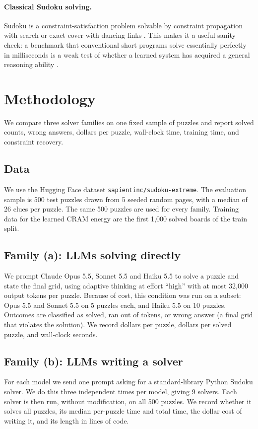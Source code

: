 \documentclass{article} %
\begin{document}
\paragraph{Classical Sudoku solving.}
Sudoku is a constraint-satisfaction problem solvable by constraint propagation with search \citep{norvig2006sudoku} or exact cover with dancing links \citep{knuth2000dlx}. This makes it a useful sanity check: a benchmark that conventional short programs solve essentially perfectly in milliseconds is a weak test of whether a learned system has acquired a general reasoning ability \citep{chollet2019measure}.

\section{Methodology}
\label{sec:method}
We compare three solver families on one fixed sample of puzzles and report solved counts, wrong answers, dollars per puzzle, wall-clock time, training time, and constraint recovery.

\subsection{Data}
We use the Hugging Face dataset \texttt{sapientinc/sudoku-extreme}. The evaluation sample is 500 test puzzles drawn from 5 seeded random pages, with a median of 26 clues per puzzle. The same 500 puzzles are used for every family. Training data for the learned CRAM energy are the first 1{,}000 solved boards of the train split.

\subsection{Family (a): LLMs solving directly}
We prompt Claude Opus 5.5, Sonnet 5.5 and Haiku 5.5 to solve a puzzle and state the final grid, using adaptive thinking at effort ``high'' with at most 32{,}000 output tokens per puzzle. Because of cost, this condition was run on a subset: Opus 5.5 and Sonnet 5.5 on 5 puzzles each, and Haiku 5.5 on 10 puzzles. Outcomes are classified as solved, ran out of tokens, or wrong answer (a final grid that violates the solution). We record dollars per puzzle, dollars per solved puzzle, and wall-clock seconds.

\subsection{Family (b): LLMs writing a solver}
For each model we send one prompt asking for a standard-library Python Sudoku solver. We do this three independent times per model, giving 9 solvers. Each solver is then run, without modification, on all 500 puzzles. We record whether it solves all puzzles, its median per-puzzle time and total time, the dollar cost of writing it, and its length in lines of code.
\end{document}
